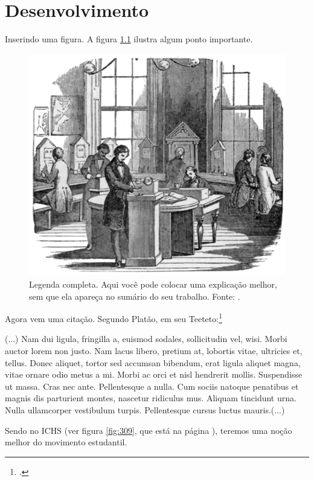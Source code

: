 \chapter{Desenvolvimento}
Inserindo uma figura. A figura \ref{fig:308} ilustra algum ponto importante. 
\begin{figure}[!htbp]
	\centering
	\includegraphics[scale=0.3]{figuras/fig09.pdf} %
	\caption[Legenda reduzida - aparece no sumario]{Legenda completa. Aqui você pode colocar uma explicação melhor, sem que ela apareça no sumário do seu trabalho. Fonte: \cite[p.~117]{boyle1772}.} 
	\label{fig:308} 
\end{figure} 

Agora vem uma citação. Segundo Platão, em seu Teeteto:\footcite{platao-teeteto}
\begin{citacao}
	(...) Nam dui ligula, fringilla a, euismod sodales, sollicitudin vel, wisi. Morbi auctor lorem non justo. Nam lacus libero, pretium at, lobortis vitae, ultricies et, tellus. Donec aliquet, tortor sed accumsan bibendum, erat ligula aliquet magna, vitae ornare odio metus a mi. Morbi ac orci et nisl hendrerit mollis. Suspendisse ut massa. Cras nec ante. Pellentesque a nulla. Cum sociis natoque penatibus et magnis dis parturient montes, nascetur ridiculus mus. Aliquam tincidunt urna. Nulla
	ullamcorper vestibulum turpis. Pellentesque cursus luctus mauris.(...)
\end{citacao}

Sendo no ICHS (ver figura \ref{fig:309}, que está na página \pageref{fig:309}), teremos uma noção melhor do movimento estudantil.


